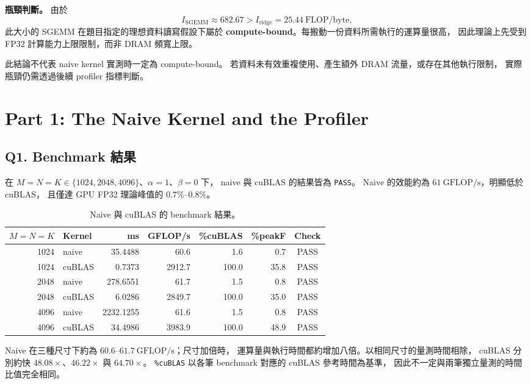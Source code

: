 \documentclass[UTF8,fontset=none,11pt,a4paper]{ctexart}
\begin{document}
\textbf{瓶頸判斷。}
由於
\[
I_{\mathrm{SGEMM}}\approx682.67
>I_{\mathrm{ridge}}=25.44\ \mathrm{FLOP/byte},
\]
此大小的 SGEMM 在題目指定的理想資料讀寫假設下屬於
\textbf{compute-bound}。每搬動一份資料所需執行的運算量很高，
因此理論上先受到 FP32 計算能力上限限制，而非 DRAM 頻寬上限。

此結論不代表 naive kernel 實測時一定為 compute-bound。
若資料未有效重複使用、產生額外 DRAM 流量，或存在其他執行限制，
實際瓶頸仍需透過後續 profiler 指標判斷。

\clearpage
\section*{Part 1: The Naive Kernel and the Profiler}

\subsection*{Q1. Benchmark 結果}

在 $M=N=K\in\{1024,2048,4096\}$、$\alpha=1$、$\beta=0$ 下，
naive 與 cuBLAS 的結果皆為 \texttt{PASS}。
Naive 的效能約為 $61\ \mathrm{GFLOP/s}$，明顯低於 cuBLAS，
且僅達 GPU FP32 理論峰值的 $0.7\%$--$0.8\%$。

\begin{table}[H]
\centering
\small
\begin{tabular}{@{}rlrrrrc@{}}
\toprule
$M=N=K$ & Kernel & ms & GFLOP/s & \%cuBLAS & \%peakF & Check \\
\midrule
1024 & naive  & 35.4488   & 60.6   & 1.6   & 0.7  & PASS \\
1024 & cuBLAS & 0.7373    & 2912.7 & 100.0 & 35.8 & PASS \\
2048 & naive  & 278.6551  & 61.7   & 1.5   & 0.8  & PASS \\
2048 & cuBLAS & 6.0286    & 2849.7 & 100.0 & 35.0 & PASS \\
4096 & naive  & 2232.1255 & 61.6   & 1.5   & 0.8  & PASS \\
4096 & cuBLAS & 34.4986   & 3983.9 & 100.0 & 48.9 & PASS \\
\bottomrule
\end{tabular}
\caption{Naive 與 cuBLAS 的 benchmark 結果。}
\label{tab:part1-benchmark}
\end{table}

Naive 在三種尺寸下約為 $60.6$--$61.7\ \mathrm{GFLOP/s}$；尺寸加倍時，
運算量與執行時間都約增加八倍。以相同尺寸的量測時間相除，
cuBLAS 分別約快 $48.08\times$、$46.22\times$ 與 $64.70\times$。
\texttt{\%cuBLAS} 以各筆 benchmark 對應的 cuBLAS 參考時間為基準，
因此不一定與兩筆獨立量測的時間比值完全相同。
\end{document}
